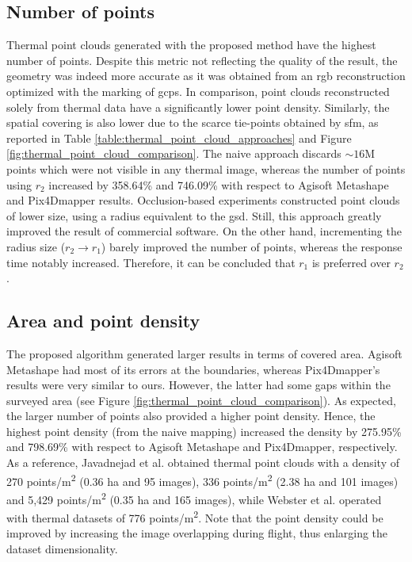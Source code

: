 \subsection{Number of points} 

Thermal point clouds generated with the proposed method have the highest number of points. Despite this metric not reflecting the quality of the result, the geometry was indeed more accurate as it was obtained from an \acrshort{rgb} reconstruction optimized with the marking of \acrshort{gcp}s. In comparison, point clouds reconstructed solely from thermal data have a significantly lower point density. Similarly, the spatial covering is also lower due to the scarce tie-points obtained by \acrshort{sfm}, as reported in Table \ref{table:thermal_point_cloud_approaches} and Figure \ref{fig:thermal_point_cloud_comparison}. The naive approach discards $\sim16$M points which were not visible in any thermal image, whereas the number of points using $r_2$ increased by 358.64\% and 746.09\% with respect to Agisoft Metashape and Pix4Dmapper results. Occlusion-based experiments constructed point clouds of lower size, using a radius equivalent to the \acrshort{gsd}. Still, this approach greatly improved the result of commercial software. On the other hand, incrementing the radius size ($r_2 \rightarrow r_1$) barely improved the number of points, whereas the response time notably increased. Therefore, it can be concluded that $r_1$ is preferred over $r_2$.

\subsection{Area and point density}

The proposed algorithm generated larger results in terms of covered area. Agisoft Metashape had most of its errors at the boundaries, whereas Pix4Dmapper's results were very similar to ours. However, the latter had some gaps within the surveyed area (see Figure \ref{fig:thermal_point_cloud_comparison}). As expected, the larger number of points also provided a higher point density. Hence, the highest point density (from the naive mapping) increased the density by 275.95\% and 798.69\% with respect to Agisoft Metashape and Pix4Dmapper, respectively. As a reference, Javadnejad et al. \cite{javadnejad_photogrammetric_2020} obtained thermal point clouds with a density of 270 points/\si{\meter\squared} (0.36 \si{\hectare} and 95 images), 336 points/\si{\meter\squared} (2.38 \si{\hectare} and 101 images) and 5,429 points/\si{\meter\squared} (0.35 \si{\hectare} and 165 images), while Webster et al. \cite{webster_three-dimensional_2018} operated with thermal datasets of 776 points/\si{\meter\squared}. Note that the point density could be improved by increasing the image overlapping during flight, thus enlarging the dataset dimensionality.

